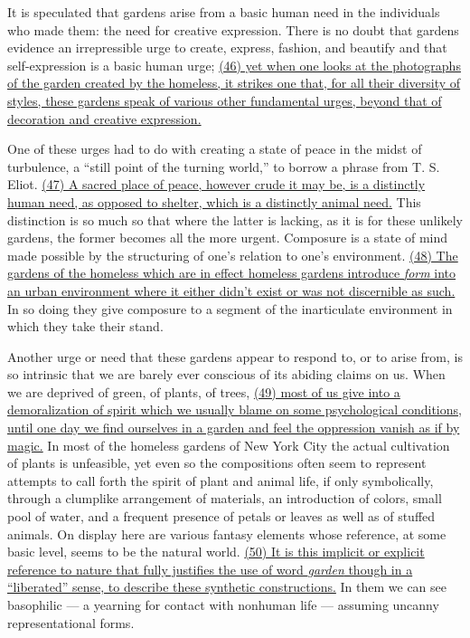 
\qquad It is speculated that gardens arise from a basic human need in the individuals who made them: the need for creative expression. There is no doubt that gardens evidence an irrepressible urge to create, express, fashion, and beautify and that self-expression is a basic human urge; \ul{(46) yet when one looks at the photographs of the garden created by the homeless, it strikes one that, for all their diversity of styles, these gardens speak of various other fundamental urges, beyond that of decoration and creative expression.}

\qquad One of these urges had to do with creating a state of peace in the midst of turbulence, a ``still point of the turning world,'' to borrow a phrase from T. S. Eliot. \ul{(47) A sacred place of peace, however crude it may be, is a distinctly human need, as opposed to shelter, which is a distinctly animal need.} This distinction is so much so that where the latter is lacking, as it is for these unlikely gardens, the former becomes all the more urgent. Composure is a state of mind made possible by the structuring of one's relation to one's environment. \ul{(48) The gardens of the homeless which are in effect homeless gardens introduce \emph{form} into an urban environment where it either didn't exist or was not discernible as such.} In so doing they give composure to a segment of the inarticulate environment in which they take their stand.

\qquad Another urge or need that these gardens appear to respond to, or to arise from, is so intrinsic that we are barely ever conscious of its abiding claims on us. When we are deprived of green, of plants, of trees, \ul{(49) most of us give into a demoralization of spirit which we usually blame on some psychological conditions, until one day we find ourselves in a garden and feel the oppression vanish as if by magic.} In most of the homeless gardens of New York City the actual cultivation of plants is unfeasible, yet even so the compositions often seem to represent attempts to call forth the spirit of plant and animal life, if only symbolically, through a clumplike arrangement of materials, an introduction of colors, small pool of water, and a frequent presence of petals or leaves as well as of stuffed animals. On display here are various fantasy elements whose reference, at some basic level, seems to be the natural world. \ul{(50) It is this implicit or explicit reference to nature that fully justifies the use of word \emph{garden} though in a ``liberated'' sense, to describe these synthetic constructions.} In them we can see basophilic --- a yearning for contact with nonhuman life --- assuming uncanny representational forms.

